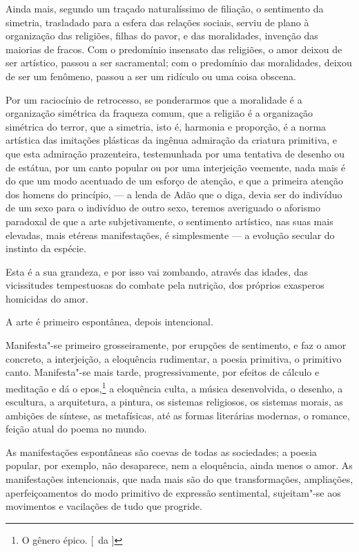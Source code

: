 Ainda mais, segundo um traçado naturalíssimo de filiação, o sentimento da
simetria, trasladado para a esfera das relações sociais, serviu de
plano à organização das religiões, filhas do pavor, e das moralidades,
invenção das maiorias de fracos. Com o predomínio insensato das
religiões, o amor deixou de ser artístico, passou a ser sacramental;
com o predomínio das moralidades, deixou de ser um fenômeno, passou a
ser um ridículo ou uma coisa obscena. 

Por um raciocínio de retrocesso,
se ponderarmos que a moralidade é a organização simétrica da fraqueza
comum, que a religião é a organização simétrica do terror, que a
simetria, isto é, harmonia e proporção, é a norma artística das
imitações plásticas da ingênua admiração da criatura primitiva, e que
esta admiração prazenteira, testemunhada por uma tentativa de desenho
ou de estátua, por um canto popular ou por uma interjeição veemente,
nada mais é do que um modo acentuado de um esforço de atenção, e que a
primeira atenção dos homens do princípio, --- a lenda de Adão que o
diga, devia ser do indivíduo de um sexo para o indivíduo de outro sexo,
teremos averiguado o aforismo paradoxal de que a arte subjetivamente, o
sentimento artístico, nas suas mais elevadas, mais etéreas
manifestações, é simplesmente --- a evolução secular do instinto da
espécie. 

Esta é a sua grandeza, e por isso vai zombando, através das
idades, das vicissitudes tempestuosas do combate pela nutrição, dos
próprios exasperos homicidas do amor. 

A arte é primeiro espontânea, depois intencional. 

Manifesta"-se primeiro grosseiramente, por
erupções de sentimento, e faz o amor concreto, a interjeição, a
eloquência rudimentar, a poesia primitiva, o primitivo canto.
Manifesta"-se mais tarde, progressivamente, por efeitos de cálculo e
meditação e dá o epos,\footnote{ O gênero épico. [~da ]} a eloquência 
culta, a música desenvolvida, o
desenho, a escultura, a arquitetura, a pintura, os sistemas religiosos,
os sistemas morais, as ambições de síntese, as metafísicas, até as
formas literárias modernas, o romance, feição atual do poema no mundo.

As manifestações espontâneas são coevas de todas as sociedades; a poesia
popular, por exemplo, não desaparece, nem a eloquência, ainda menos o
amor. As manifestações intencionais, que nada mais são do que
transformações, ampliações, aperfeiçoamentos do modo primitivo de
expressão sentimental, sujeitam"-se aos movimentos e vacilações de
tudo que progride. 

